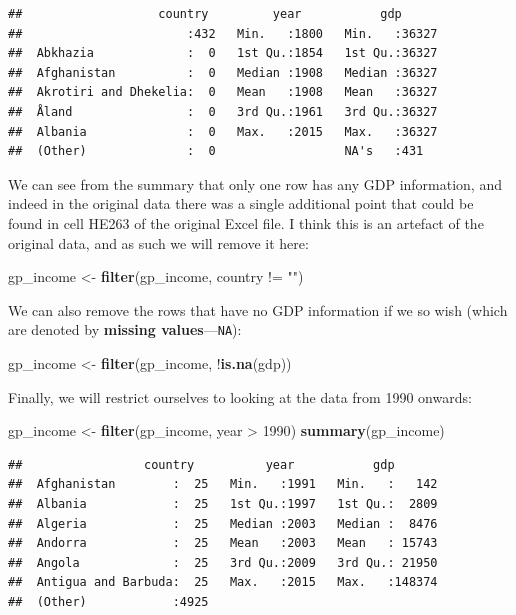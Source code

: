 \documentclass[]{book}
\newenvironment{Shaded}{\begin{snugshade}}{\end{snugshade}}
\newcommand{\KeywordTok}[1]{\textcolor[rgb]{0.13,0.29,0.53}{\textbf{{#1}}}}
\newcommand{\DecValTok}[1]{\textcolor[rgb]{0.00,0.00,0.81}{{#1}}}
\newcommand{\StringTok}[1]{\textcolor[rgb]{0.31,0.60,0.02}{{#1}}}
\newcommand{\NormalTok}[1]{{#1}}
\theoremstyle{definition}
\theoremstyle{definition}
\theoremstyle{definition}
\theoremstyle{remark}
\begin{document}
\begin{verbatim}
##                   country         year           gdp       
##                       :432   Min.   :1800   Min.   :36327  
##  Abkhazia             :  0   1st Qu.:1854   1st Qu.:36327  
##  Afghanistan          :  0   Median :1908   Median :36327  
##  Akrotiri and Dhekelia:  0   Mean   :1908   Mean   :36327  
##  Åland                :  0   3rd Qu.:1961   3rd Qu.:36327  
##  Albania              :  0   Max.   :2015   Max.   :36327  
##  (Other)              :  0                  NA's   :431
\end{verbatim}

We can see from the summary that only one row has any GDP information,
and indeed in the original data there was a single additional point that
could be found in cell HE263 of the original Excel file. I think this is
an artefact of the original data, and as such we will remove it here:

\begin{Shaded}
\begin{Highlighting}[]
\NormalTok{gp_income <-}\StringTok{ }\KeywordTok{filter}\NormalTok{(gp_income, country !=}\StringTok{ ""}\NormalTok{)}
\end{Highlighting}
\end{Shaded}

We can also remove the rows that have no GDP information if we so wish
(which are denoted by \textbf{missing values}---\texttt{NA}):

\begin{Shaded}
\begin{Highlighting}[]
\NormalTok{gp_income <-}\StringTok{ }\KeywordTok{filter}\NormalTok{(gp_income, !}\KeywordTok{is.na}\NormalTok{(gdp))}
\end{Highlighting}
\end{Shaded}

Finally, we will restrict ourselves to looking at the data from 1990
onwards:

\begin{Shaded}
\begin{Highlighting}[]
\NormalTok{gp_income <-}\StringTok{ }\KeywordTok{filter}\NormalTok{(gp_income, year >}\StringTok{ }\DecValTok{1990}\NormalTok{)}
\KeywordTok{summary}\NormalTok{(gp_income)}
\end{Highlighting}
\end{Shaded}

\begin{verbatim}
##                 country          year           gdp        
##  Afghanistan        :  25   Min.   :1991   Min.   :   142  
##  Albania            :  25   1st Qu.:1997   1st Qu.:  2809  
##  Algeria            :  25   Median :2003   Median :  8476  
##  Andorra            :  25   Mean   :2003   Mean   : 15743  
##  Angola             :  25   3rd Qu.:2009   3rd Qu.: 21950  
##  Antigua and Barbuda:  25   Max.   :2015   Max.   :148374  
##  (Other)            :4925
\end{verbatim}
\end{document}
